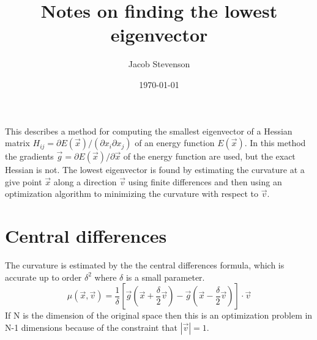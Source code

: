 \documentclass[a4paper]{article}
\title{Notes on finding the lowest eigenvector}
\author{Jacob Stevenson}
\date{\today}
\begin{document}
\maketitle

This describes a method for computing the smallest eigenvector of a Hessian matrix
$H_{ij} = \partial E(\vec{x}) / (\partial{x_i}\partial x_j)$ 
of an energy function $E(\vec{x})$.  In this method the gradients $\vec{g} = \partial
E(\vec{x}) / \partial \vec{x}$
of the energy function are used, but the exact Hessian is not.  The lowest eigenvector is found
by estimating the curvature at a give point $\vec{x}$ along a direction $\vec{v}$ using finite differences and then
using an optimization algorithm to minimizing the curvature with respect
to $\vec{v}$.  

\section{Central differences}
The curvature
is estimated by the the central differences formula, which is accurate up to
order $\delta^2$ where $\delta$ is a small parameter.
\begin{equation}
\mu(\vec{x}, \vec{v}) = \frac{1}{\delta} 
\left[ \vec{g}(\vec{x} + \frac{\delta}{2}  \vec{v}) - 
\vec{g}(\vec{x} - \frac{\delta}{2} \vec{v}) \right] \cdot \vec{v}
\end{equation}
If N is the dimension of the original space then this is an optimization
problem in N-1 dimensions because of the constraint that $\left|\vec{v} \right|
= 1$.
\end{document}

